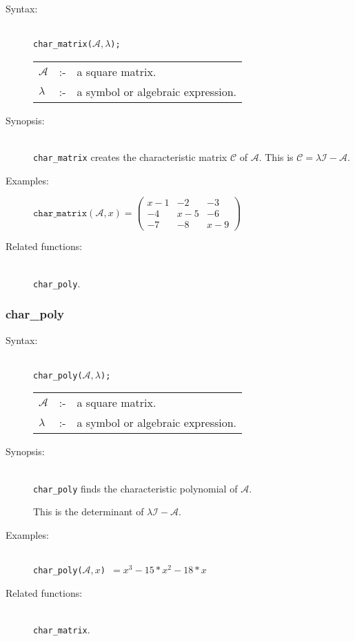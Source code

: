 \begin{description}
\item[Syntax:]\mbox{}\\
\texttt{char\_matrix($\mathcal{A},\lambda$);}\\[2mm]
\begin{tabular}{l l l}
$\mathcal{A}$ &:-& a square matrix. \\
$\lambda$  &:-& a symbol or algebraic expression.
\end{tabular}

\item[Synopsis:]\mbox{}\\
\texttt{char\_matrix} creates the characteristic matrix $\mathcal{C}$ of
$\mathcal{A}$.  This is $\mathcal{C} = \lambda \mathcal{I} - \mathcal{A}$.

\item[Examples:]
\begin{flushleft}
\(
\texttt{char\_matrix}(\mathcal{A},x) =
\begin{pmatrix} x-1 & -2 & -3 \\ -4 & x-5 & -6 \\ -7 & -8 & x-9 \end{pmatrix}
\)
\end{flushleft}

\item[Related functions:]\mbox{}\\
\texttt{char\_poly}.
\end{description}


\subsubsection{char\_poly}
\label{linalg:char_poly}

\begin{description}
\item[Syntax:]\mbox{}\\
\texttt{char\_poly($\mathcal{A},\lambda$);}\\[2mm]
\begin{tabular}{l l l}
$\mathcal{A}$ &:-& a square matrix. \\
$\lambda$ &:-& a symbol or algebraic expression.
\end{tabular}

\item[Synopsis:]\mbox{}\\
\texttt{char\_poly} finds the characteristic polynomial of
                $\mathcal{A}$.

This is the determinant of $\lambda \mathcal{I} - \mathcal{A}$.

\item[Examples:]\mbox{}\\
\texttt{char\_poly($\mathcal{A},x$) $= x^3-15*x^2-18*x$}

\item[Related functions:]\mbox{}\\
 \texttt{char\_matrix}.
\end{description}


